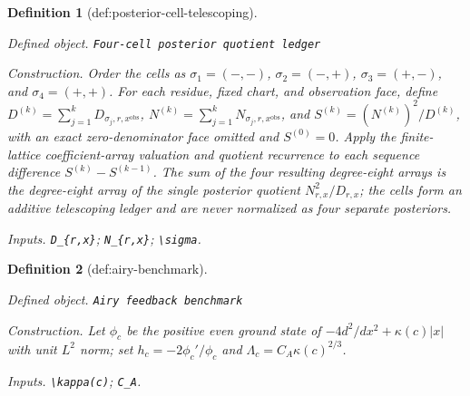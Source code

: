 \documentclass{article}
\newtheorem{definition}{Definition}
\begin{document}
\begin{definition}[def:posterior-cell-telescoping]\label{def:posterior-cell-telescoping}
\par\smallskip\noindent\emph{Defined object.} \texttt{Four-\allowbreak{}cell posterior quotient ledger}
\par\smallskip\noindent\emph{Construction.} Order the cells as \(\sigma_1=(-,-)\), \(\sigma_2=(-,+)\), \(\sigma_3=(+,-)\), and \(\sigma_4=(+,+)\). For each residue, fixed chart, and observation face, define \(D^{(k)}=\sum_{j=1}^kD_{\sigma_j,r,x^{\mathrm{obs}}}\), \(N^{(k)}=\sum_{j=1}^kN_{\sigma_j,r,x^{\mathrm{obs}}}\), and \(S^{(k)}=(N^{(k)})^2/D^{(k)}\), with an exact zero-denominator face omitted and \(S^{(0)}=0\). Apply the finite-lattice coefficient-array valuation and quotient recurrence to each sequence difference \(S^{(k)}-S^{(k-1)}\). The sum of the four resulting degree-eight arrays is the degree-eight array of the single posterior quotient \(N_{r,x}^2/D_{r,x}\); the cells form an additive telescoping ledger and are never normalized as four separate posteriors.
\par\smallskip\noindent\emph{Inputs.} \texttt{D\_\allowbreak{}\{r,\allowbreak{}x\}\allowbreak{}}; \texttt{N\_\allowbreak{}\{r,\allowbreak{}x\}\allowbreak{}}; \texttt{\textbackslash{}\allowbreak{}sigma}.
\end{definition}

\begin{definition}[def:airy-benchmark]\label{def:airy-benchmark}
\par\smallskip\noindent\emph{Defined object.} \texttt{Airy feedback benchmark}
\par\smallskip\noindent\emph{Construction.} Let \(\phi_c\) be the positive even ground state of \(-4d^2/dx^2+\kappa(c)|x|\) with unit \(L^2\) norm; set \(h_c=-2\phi_c'/\phi_c\) and \(\Lambda_c=C_A\kappa(c)^{2/3}\).
\par\smallskip\noindent\emph{Inputs.} \texttt{\textbackslash{}\allowbreak{}kappa(c)}; \texttt{C\_\allowbreak{}A}.
\end{definition}
\end{document}
